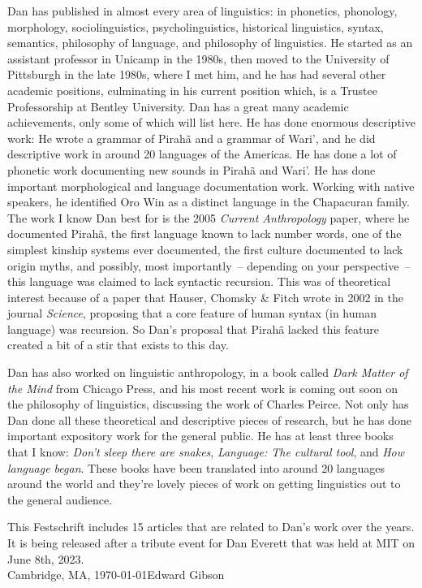 \begin{refsection}
Dan has published in almost every area of linguistics: in phonetics, phonology, morphology, sociolinguistics, psycholinguistics, historical linguistics, syntax, semantics, philosophy of language, and philosophy of linguistics. He started as an assistant professor in Unicamp in the 1980s, then moved to the University of Pittsburgh in the late 1980s, where I met him, and he has had several other academic positions, culminating in his current position which, is a Trustee Professorship at  Bentley University. Dan has a great many academic achievements, only some of which will list here. He has done enormous descriptive work: He wrote  a grammar of Pirahã and a grammar of Wari', and he did descriptive work in around 20 languages of the Americas. He has done a lot of phonetic work documenting new sounds in Pirahã and Wari'. He has done important morphological and language documentation work. Working with native speakers, he identified Oro Win as a distinct language in the Chapacuran family. The work I know Dan best for is the 2005 \textit{Current Anthropology} paper, where he documented Pirahã, the first language known to lack number words, one of the simplest kinship systems ever documented, the first culture documented to lack origin myths, and possibly, most importantly~-- depending on your perspective~-- this language was claimed to lack syntactic recursion. This was of theoretical interest because of a paper that Hauser, Chomsky \& Fitch wrote in 2002 in the journal \textit{Science}, proposing that a core feature of human syntax (in human language) was recursion. So Dan's proposal that Pirahã lacked this feature created a bit of a stir that exists to this day.

Dan has also worked on linguistic anthropology, in a book called \textit{Dark Matter of the Mind} from Chicago Press, and his most recent work is coming out soon on the philosophy of linguistics, discussing the work of Charles Peirce.  Not only has Dan done all these theoretical and descriptive pieces of research, but he has done important expository work for the general public. He has at least three books that I know: \textit{Don't sleep there are snakes}, \textit{Language: The cultural tool}, and \textit{How language began}. These books have been translated into around 20 languages around the world and they're lovely pieces of work on getting linguistics out to the general audience. 

This Festschrift includes 15 articles that are related to Dan's work over the years. It is being released after a tribute event for Dan Everett that was held at MIT on June 8th, 2023.\bigskip\\
\noindent Cambridge, MA, \today\hfill Edward Gibson %

{\sloppy\printbibliography[heading=subbibliography]}
\end{refsection}
